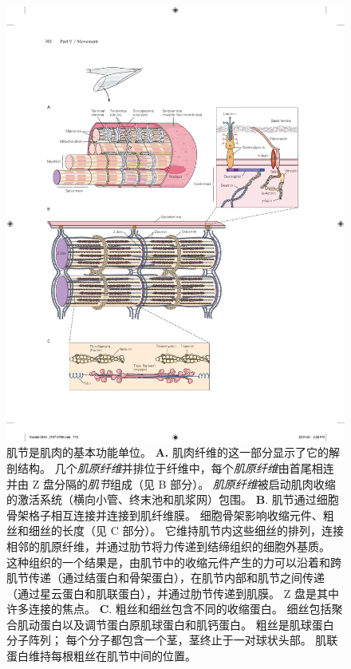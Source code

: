 \begin{figure}[htbp]
	\centering
	\includegraphics[width=1.0\linewidth]{chap31/fig_31_9}
	\caption{肌节是肌肉的基本功能单位\cite{bloom1952textbook}。
	\textbf{A.} 肌肉纤维的这一部分显示了它的解剖结构。
	几个\textit{肌原纤维}并排位于纤维中，每个\textit{肌原纤维}由首尾相连并由 Z 盘分隔的\textit{肌节}组成（见 B 部分）。
	\textit{肌原纤维}被启动肌肉收缩的激活系统（横向小管、终末池和肌浆网）包围。
	\textbf{B}. 肌节通过细胞骨架格子相互连接并连接到肌纤维膜。
	细胞骨架影响收缩元件、粗丝和细丝的长度（见 C 部分）。
	它维持肌节内这些细丝的排列，连接相邻的肌原纤维，并通过肋节将力传递到结缔组织的细胞外基质。
	这种组织的一个结果是，由肌节中的收缩元件产生的力可以沿着和跨肌节传递（通过结蛋白和骨架蛋白），在肌节内部和肌节之间传递（通过星云蛋白和肌联蛋白），并通过肋节传递到肌膜。
	Z 盘是其中许多连接的焦点。
	\textbf{C}. 粗丝和细丝包含不同的收缩蛋白。
	细丝包括聚合肌动蛋白以及调节蛋白原肌球蛋白和肌钙蛋白。
	粗丝是肌球蛋白分子阵列；
	每个分子都包含一个茎，茎终止于一对球状头部。
	肌联蛋白维持每根粗丝在肌节中间的位置。}
	\label{fig:31_9}
\end{figure}


